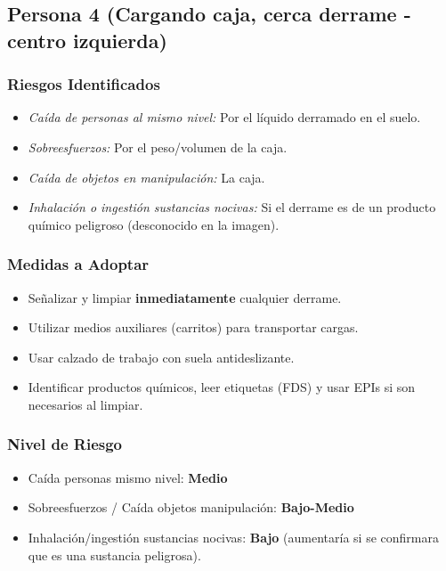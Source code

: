 \documentclass[12pt,a4paper]{article}
\begin{document}
	\subsection{Persona 4 (Cargando caja, cerca derrame - centro izquierda)}
	
	\subsubsection{Riesgos Identificados}
	\begin{itemize}
		\item \textit{Caída de personas al mismo nivel:} Por el líquido derramado en el suelo.
		\item \textit{Sobreesfuerzos:} Por el peso/volumen de la caja.
		\item \textit{Caída de objetos en manipulación:} La caja.
		\item \textit{Inhalación o ingestión sustancias nocivas:} Si el derrame es de un producto químico peligroso (desconocido en la imagen).
	\end{itemize}
	
	\subsubsection{Medidas a Adoptar}
	\begin{itemize}
		\item Señalizar y limpiar \textbf{inmediatamente} cualquier derrame.
		\item Utilizar medios auxiliares (carritos) para transportar cargas.
		\item Usar calzado de trabajo con suela antideslizante.
		\item Identificar productos químicos, leer etiquetas (FDS) y usar EPIs si son necesarios al limpiar.
	\end{itemize}
	
	\subsubsection{Nivel de Riesgo}
	\begin{itemize}
		\item Caída personas mismo nivel: \textbf{Medio}
		\item Sobreesfuerzos / Caída objetos manipulación: \textbf{Bajo-Medio}
		\item Inhalación/ingestión sustancias nocivas: \textbf{Bajo} (aumentaría si se confirmara que es una sustancia peligrosa).
	\end{itemize}
	
\end{document}
